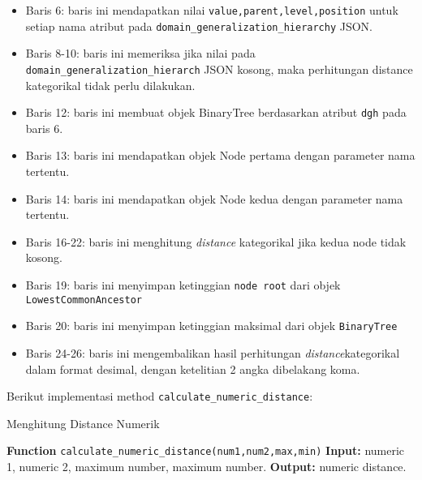 \vspace{0.2cm}
\begin{itemize}
\item Baris 6: baris ini mendapatkan nilai \texttt{value,parent,level,position} untuk setiap nama atribut pada \texttt{domain\_generalization\_hierarchy} JSON.
\item Baris 8-10: baris ini memeriksa jika nilai pada \texttt{domain\_generalization\_hierarch} JSON kosong, maka perhitungan distance kategorikal tidak perlu dilakukan.
\item Baris 12: baris ini membuat objek BinaryTree berdasarkan atribut \texttt{dgh} pada baris 6.
\item Baris 13: baris ini mendapatkan objek Node pertama dengan parameter nama tertentu.
\item Baris 14: baris ini mendapatkan objek Node kedua dengan parameter nama tertentu.
\item Baris 16-22: baris ini menghitung \textit{distance} kategorikal jika kedua node tidak kosong.
\item Baris 19: baris ini menyimpan ketinggian \texttt{node root} dari objek \texttt{LowestCommonAncestor}
\item Baris 20: baris ini menyimpan ketinggian maksimal dari objek \texttt{BinaryTree}
\item Baris 24-26: baris ini mengembalikan hasil perhitungan \textit{distance}kategorikal dalam format desimal, dengan ketelitian 2 angka dibelakang koma.
\end{itemize}


\noindent Berikut implementasi method \texttt{calculate\_numeric\_distance}:

\begin{minipage}{.85\linewidth}
\begin{algorithm}[H]
  \caption{Menghitung Distance Numerik}\label{alg:6}
  \begin{algorithmic}[1]
  \State \textbf{Function} \texttt{calculate\_numeric\_distance(num1,num2,max,min)}
  \State \textbf{Input:} numeric 1, numeric 2, maximum number, maximum number.
  \State \textbf{Output:} numeric distance.
  \\
  \end{algorithmic}
\end{algorithm}
\end{minipage}

